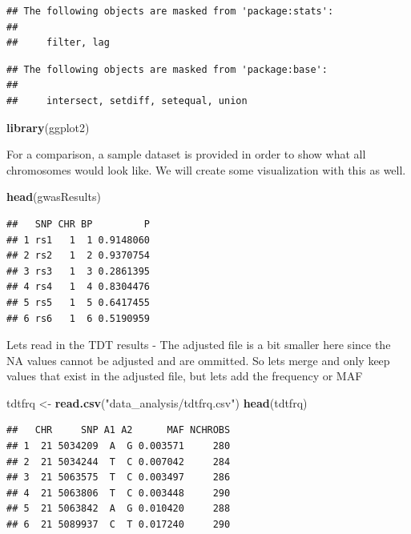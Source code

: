 \documentclass[
]{article}
\newenvironment{Shaded}{\begin{snugshade}}{\end{snugshade}}
\newcommand{\KeywordTok}[1]{\textcolor[rgb]{0.13,0.29,0.53}{\textbf{#1}}}
\newcommand{\NormalTok}[1]{#1}
\newcommand{\StringTok}[1]{\textcolor[rgb]{0.31,0.60,0.02}{#1}}
\begin{document}
\begin{verbatim}
## The following objects are masked from 'package:stats':
## 
##     filter, lag
\end{verbatim}

\begin{verbatim}
## The following objects are masked from 'package:base':
## 
##     intersect, setdiff, setequal, union
\end{verbatim}

\begin{Shaded}
\begin{Highlighting}[]
\KeywordTok{library}\NormalTok{(ggplot2)}
\end{Highlighting}
\end{Shaded}

For a comparison, a sample dataset is provided in order to show what all
chromosomes would look like. We will create some visualization with this
as well.

\begin{Shaded}
\begin{Highlighting}[]
\KeywordTok{head}\NormalTok{(gwasResults)}
\end{Highlighting}
\end{Shaded}

\begin{verbatim}
##   SNP CHR BP         P
## 1 rs1   1  1 0.9148060
## 2 rs2   1  2 0.9370754
## 3 rs3   1  3 0.2861395
## 4 rs4   1  4 0.8304476
## 5 rs5   1  5 0.6417455
## 6 rs6   1  6 0.5190959
\end{verbatim}

Lets read in the TDT results - The adjusted file is a bit smaller here
since the NA values cannot be adjusted and are ommitted. So lets merge
and only keep values that exist in the adjusted file, but lets add the
frequency or MAF

\begin{Shaded}
\begin{Highlighting}[]
\NormalTok{tdtfrq <-}\StringTok{ }\KeywordTok{read.csv}\NormalTok{(}\StringTok{"data_analysis/tdtfrq.csv"}\NormalTok{)}
\KeywordTok{head}\NormalTok{(tdtfrq)}
\end{Highlighting}
\end{Shaded}

\begin{verbatim}
##   CHR     SNP A1 A2      MAF NCHROBS
## 1  21 5034209  A  G 0.003571     280
## 2  21 5034244  T  C 0.007042     284
## 3  21 5063575  T  C 0.003497     286
## 4  21 5063806  T  C 0.003448     290
## 5  21 5063842  A  G 0.010420     288
## 6  21 5089937  C  T 0.017240     290
\end{verbatim}
\end{document}
